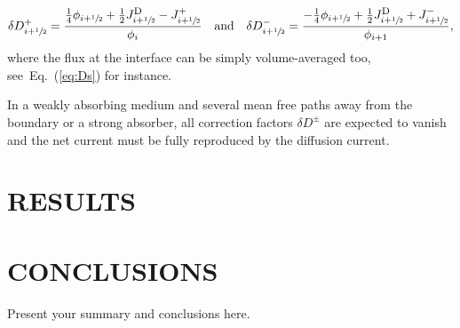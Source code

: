 \documentclass[letterpaper]{physor2020}
\newcommand{\eq}[1]{Eq.~(\ref{#1})}
\newcommand{\jp}{\ensuremath{J^+}}
\newcommand{\jm}{\ensuremath{J^-}}
\newcommand{\jD}{\ensuremath{J^{\textrm{\scriptsize{D}}}}}
\newcommand{\hzi}{\ensuremath{\sfrac{1}{2}}}
\begin{document}
\begin{equation}
  \label{eq:ccfsss1}
  \delta D^+ _{i+\hzi} = \frac{\frac{1}{4}\phi_{i+\hzi}
  	+ \frac{1}{2}\jD _{i+\hzi} - \jp _{i+\hzi}}{\phi_i}
  \quad \text{and} \quad
  \delta D^- _{i+\hzi} = \frac{-\frac{1}{4}\phi_{i+\hzi}
  	+ \frac{1}{2}\jD _{i+\hzi} + \jm _{i+\hzi}}{\phi_{i+1}},
  \end{equation}
where the flux at the interface can be simply volume-averaged too, see~\eq{eq:Ds} for instance.

In a weakly absorbing medium and several mean free paths away from the boundary or a strong absorber, all correction factors $\delta D^\pm$ are expected to vanish and the net current must be fully reproduced by the diffusion current.%


\section{RESULTS}
\label{sec:res}


\section{CONCLUSIONS}
\label{sec:conc}

Present your summary and conclusions here.


\end{document}
